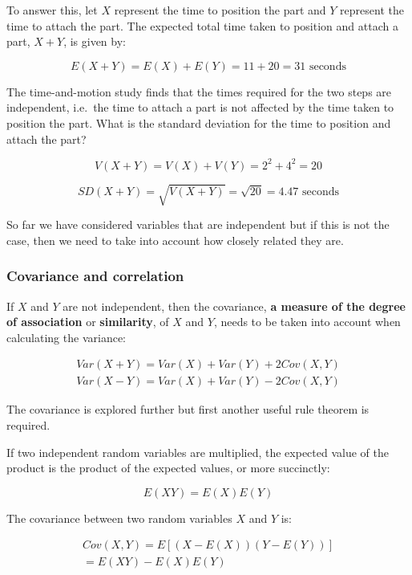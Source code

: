 \documentclass[
  oneside]{krantz}
\begin{document}
To answer this, let \(X\) represent the time to position the part and \(Y\) represent the time to attach the part. The expected total time taken to position and attach a part, \(X+Y\), is given by:

\[ E(X+Y) = E(X) + E(Y) = 11 + 20 = 31 \textrm{ seconds}\]

The time-and-motion study finds that the times required for the two steps are independent, i.e.~the time to attach a part is not affected by the time taken to position the part. What is the standard deviation for the time to position and attach the part?

\[V(X+Y) = V(X) + V(Y) = 2^2 + 4^2 = 20 \]

\[SD(X+Y) = \sqrt{V(X+Y)} = \sqrt{20} = 4.47 \textrm{ seconds}\]

So far we have considered variables that are independent but if this is not the case, then we need to take into account how closely related they are.

\hypertarget{covariance-and-correlation}{%
\subsubsection{Covariance and correlation}\label{covariance-and-correlation}}

If \(X\) and \(Y\) are not independent, then the covariance, \textbf{a measure of the degree of association} or \textbf{similarity}, of \(X\) and \(Y\), needs to be taken into account when calculating the variance:

\begin{align}
Var(X+Y) = Var(X) + Var(Y) + 2Cov(X,Y) \\
Var(X-Y) = Var(X) + Var(Y) - 2Cov(X,Y)
\end{align}

The covariance is explored further but first another useful rule theorem is required.

If two independent random variables are multiplied, the expected value of the product is the product of the expected values, or more succinctly:

\begin{equation}
E(XY) = E(X)E(Y)
\end{equation}

The covariance between two random variables \(X\) and \(Y\) is:

\begin{align}
Cov(X,Y) = E[(X-E(X))(Y-E(Y))] \\
= E(XY) - E(X)E(Y)
\end{align}
\end{document}
